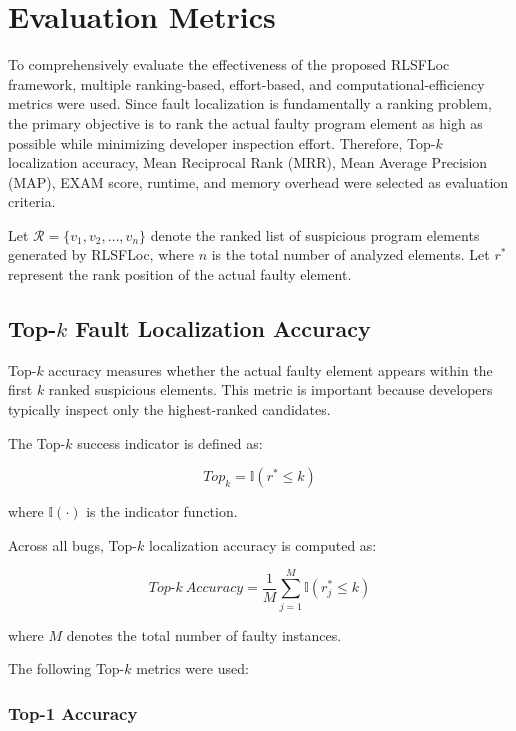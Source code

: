\documentclass[article,article,submit,pdftex,moreauthors]{Definitions/mdpi}
\begin{document}
\section{Evaluation Metrics}
\label{sec:evaluation_metrics}

To comprehensively evaluate the effectiveness of the proposed RLSFLoc framework, multiple ranking-based, effort-based, and computational-efficiency metrics were used. Since fault localization is fundamentally a ranking problem, the primary objective is to rank the actual faulty program element as high as possible while minimizing developer inspection effort. Therefore, Top-$k$ localization accuracy, Mean Reciprocal Rank (MRR), Mean Average Precision (MAP), EXAM score, runtime, and memory overhead were selected as evaluation criteria.

Let $\mathcal{R} = \{v_1, v_2, \ldots, v_n\}$ denote the ranked list of suspicious program elements generated by RLSFLoc, where $n$ is the total number of analyzed elements. Let $r^*$ represent the rank position of the actual faulty element.

\subsection{Top-$k$ Fault Localization Accuracy}

Top-$k$ accuracy measures whether the actual faulty element appears within the first $k$ ranked suspicious elements. This metric is important because developers typically inspect only the highest-ranked candidates.

The Top-$k$ success indicator is defined as:

\begin{equation}
Top_k =
\mathbb{I}(r^* \leq k)
\end{equation}

where $\mathbb{I}(\cdot)$ is the indicator function.

Across all bugs, Top-$k$ localization accuracy is computed as:

\begin{equation}
Top\text{-}k\ Accuracy =
\frac{1}{M}
\sum_{j=1}^{M}
\mathbb{I}(r_j^* \leq k)
\end{equation}

where $M$ denotes the total number of faulty instances.

The following Top-$k$ metrics were used:

\subsubsection{Top-1 Accuracy}
\end{document}
